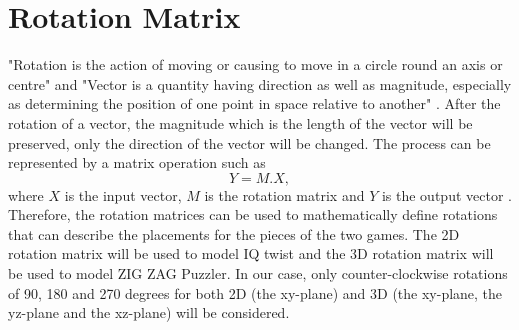 \section{Rotation Matrix}
"Rotation is the action of moving or causing to move in a circle round an axis or centre" and "Vector is a quantity having direction as well as magnitude, especially as determining the position of one point in space relative to another" \cite{r14}. After the rotation of a vector, the magnitude which is the length of the vector will be preserved, only the direction of the vector will be changed. The process can be represented by a matrix operation such as 
\begin{equation}
Y=M.X,
\end{equation}
where $X$ is the input vector, $M$ is the rotation matrix and $Y$ is the output vector \cite{r15}. Therefore, the rotation matrices can be used to mathematically define rotations that can describe the placements for the pieces of the two games. The 2D rotation matrix will be used to model IQ twist and the 3D rotation matrix will be used to model ZIG ZAG Puzzler. In our case, only counter-clockwise rotations of 90, 180 and 270 degrees for both 2D (the xy-plane) and 3D (the xy-plane, the yz-plane and the xz-plane) will be considered.
